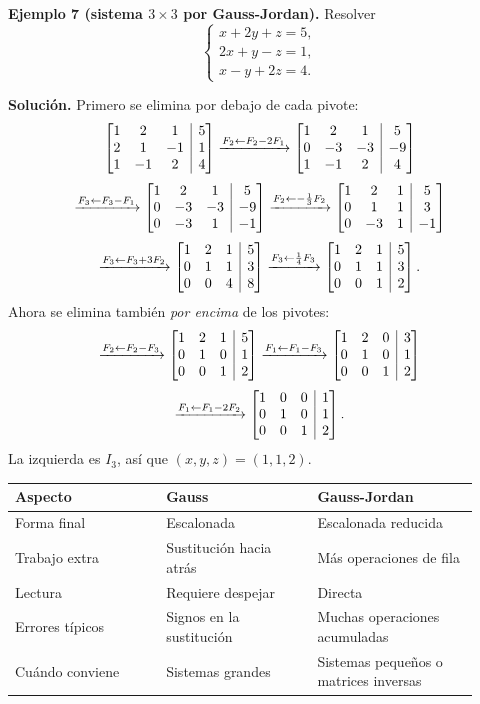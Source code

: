 \documentclass[12pt, letterpaper]{article}
\makeatletter
\newcommand{\mwaug}[2]{\ensuremath{\left[\begin{array}{@{}#1@{}}#2\end{array}\right]}}
\makeatother
\begin{document}
\begin{cuadrosolucion}
  \small
  \textbf{Ejemplo 7 (sistema $3\times3$ por Gauss-Jordan).} Resolver
  \[
    \begin{cases}
      x+2y+z=5,\\
      2x+y-z=1,\\
      x-y+2z=4.
    \end{cases}
  \]

  \medskip
  \textbf{Solución.} Primero se elimina por debajo de cada pivote:
  \[
    \mwaug{ccc|c}{1&2&1&5\\2&1&-1&1\\1&-1&2&4}
    \xrightarrow{F_2\leftarrow F_2-2F_1}
    \mwaug{ccc|c}{1&2&1&5\\0&-3&-3&-9\\1&-1&2&4}
  \]
  \[
    \xrightarrow{F_3\leftarrow F_3-F_1}
    \mwaug{ccc|c}{1&2&1&5\\0&-3&-3&-9\\0&-3&1&-1}
    \xrightarrow{F_2\leftarrow-\frac13F_2}
    \mwaug{ccc|c}{1&2&1&5\\0&1&1&3\\0&-3&1&-1}
  \]
  \[
    \xrightarrow{F_3\leftarrow F_3+3F_2}
    \mwaug{ccc|c}{1&2&1&5\\0&1&1&3\\0&0&4&8}
    \xrightarrow{F_3\leftarrow\frac14F_3}
    \mwaug{ccc|c}{1&2&1&5\\0&1&1&3\\0&0&1&2}.
  \]
  Ahora se elimina también \emph{por encima} de los pivotes:
  \[
    \xrightarrow{F_2\leftarrow F_2-F_3}
    \mwaug{ccc|c}{1&2&1&5\\0&1&0&1\\0&0&1&2}
    \xrightarrow{F_1\leftarrow F_1-F_3}
    \mwaug{ccc|c}{1&2&0&3\\0&1&0&1\\0&0&1&2}
  \]
  \[
    \xrightarrow{F_1\leftarrow F_1-2F_2}
    \mwaug{ccc|c}{1&0&0&1\\0&1&0&1\\0&0&1&2}.
  \]
  La izquierda es $I_3$, así que $(x,y,z)=(1,1,2)$.
\end{cuadrosolucion}

\begin{center}
\small
\begin{tabular}{@{}p{0.30\linewidth} p{0.30\linewidth} p{0.32\linewidth}@{}}
  \toprule
  \textbf{Aspecto} & \textbf{Gauss} & \textbf{Gauss-Jordan} \\
  \midrule
  Forma final & Escalonada & Escalonada reducida \\
  Trabajo extra & Sustitución hacia atrás & Más operaciones de fila \\
  Lectura & Requiere despejar & Directa \\
  Errores típicos & Signos en la sustitución & Muchas operaciones acumuladas \\
  Cuándo conviene & Sistemas grandes & Sistemas pequeños o matrices inversas \\
  \bottomrule
\end{tabular}
\end{center}
\end{document}
